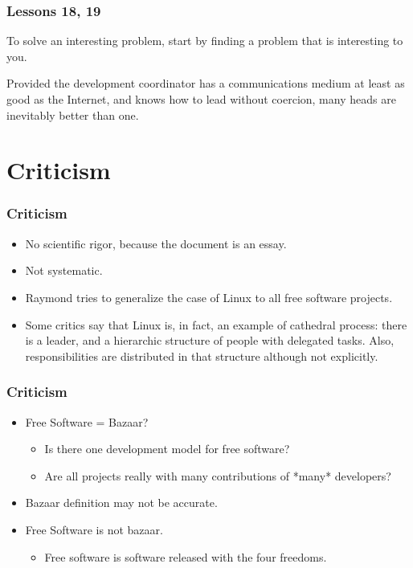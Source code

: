 \documentclass{beamer}
\begin{document}
\begin{frame}
\frametitle{Lessons 18, 19}

\begin{center}
{\large To solve an interesting problem, start by finding a problem
  that is interesting to you.}
\end{center}

\begin{center}
{\large Provided the development coordinator has a communications
  medium at least as good as the Internet, and knows how to lead
  without coercion, many heads are inevitably better than one.}
\end{center}

\end{frame}

\section{Criticism}

\begin{frame}
\frametitle{Criticism}

\begin{itemize}
\item No scientific rigor, because the document is an essay.
\item Not systematic.
\item Raymond tries to generalize the case of Linux to all free
  software projects.
\item Some critics say that Linux is, in fact, an example of cathedral
  process: there is a leader, and a hierarchic structure of people
  with delegated tasks. Also, responsibilities are distributed in that
  structure although not explicitly.
\end{itemize}

\end{frame}

\begin{frame}
\frametitle{Criticism}

\begin{itemize}
\item Free Software = Bazaar?
\begin{itemize}
\item Is there one development model for free software?
\item Are all projects really with many contributions of *many*
  developers?
\end{itemize}
\item Bazaar definition may not be accurate.

\item Free Software is not bazaar.

\begin{itemize}
\item Free software is software released with the four freedoms.
\end{itemize}

\end{itemize}

\end{frame}
\end{document}
